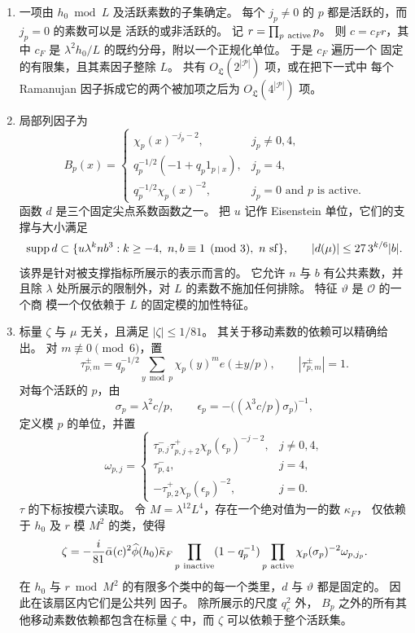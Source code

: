 \begin{enumerate}
\item 一项由 $h_0\bmod L$ 及活跃素数的子集确定。
每个 $j_p\ne0$ 的 $p$ 都是活跃的，而 $j_p=0$ 的素数可以是
活跃的或非活跃的。 记 $r=\prod_{p\ {\rm active}}p$。 则
$c=c_Fr$，其中 $c_F$ 是
$\lambda^2h_0/L$ 的既约分母，附以一个正规化单位。 于是 $c_F$ 遍历一个
固定的有限集，且其素因子整除 $L$。 共有
$O_{\mathfrak L}(2^{|\mathcal P|})$ 项，或在把下一式中
每个 Ramanujan 因子拆成它的两个被加项之后为
$O_{\mathfrak L}(4^{|\mathcal P|})$ 项。

\item 局部列因子为
\[
 B_p(x)=\begin{cases}
 \chi_p(x)^{-j_p-2},&j_p\ne0,4,\\
 q_p^{-1/2}(-1+q_p1_{p\mid x}),&j_p=4,\\
 q_p^{-1/2}\chi_p(x)^{-2},&j_p=0\text{ and }p\text{ is active}.
 \end{cases}
\]
函数 $d$ 是三个固定尖点系数函数之一。
把 $u$ 记作 Eisenstein 单位，它们的支撑与大小满足
\begin{equation}
 \operatorname{supp}d\subset
 \{u\lambda^k n b^3:k\ge-4,\ n,b\equiv1\pmod3,\ n\ {\rm sf}\},
 \qquad |d(\mu)|\le27\,3^{k/6}|b|.
 \label{old-eq:4.3}
\end{equation}
该界是针对被支撑指标所展示的表示而言的。
它允许 $n$ 与 $b$ 有公共素数，并且除
$\lambda$ 处所展示的限制外，对 $L$ 的素数不施加任何排除。
特征 $\vartheta$ 是 $\mathcal O$ 的一个商
模一个仅依赖于 $L$ 的固定模的加性特征。

\item 标量 $\zeta$ 与 $\mu$ 无关，且满足
$|\zeta|\le1/81$。 其关于移动素数的依赖可以精确给出。
对 $m\not\equiv0\pmod6$，置
\[
 \tau_{p,m}^{\pm}=q_p^{-1/2}\sum_{y\bmod p}\chi_p(y)^m e(\pm y/p),
 \qquad |\tau_{p,m}^{\pm}|=1.
\]
对每个活跃的 $p$，由
\[
 \sigma_p=\lambda^2c/p,\qquad
 \epsilon_p=-\big((\lambda^3c/p)\sigma_p\big)^{-1},
\]
定义模 $p$ 的单位，并置
\[
 \omega_{p,j}=\begin{cases}
 \tau_{p,j}^{-}\tau_{p,j+2}^{+}\chi_p(\epsilon_p)^{-j-2},&j\ne0,4,\\
 \tau_{p,4}^{-},&j=4,\\
 -\tau_{p,2}^{+}\chi_p(\epsilon_p)^{-2},&j=0.
 \end{cases}
\]
$\tau$ 的下标按模六读取。 令
$M=\lambda^{12}L^4$，存在一个绝对值为一的数 $\kappa_F$，
仅依赖于 $h_0$ 及 $r$ 模 $M^2$ 的类，使得
\begin{equation}\label{eq:reflection-row-phase}
 \zeta=-\frac i{81}\bar\alpha(c)^2\widehat\phi(h_0)\bar\kappa_F
 \prod_{p\ {\rm inactive}}(1-q_p^{-1})
 \prod_{p\ {\rm active}}\chi_p(\sigma_p)^{-2}\omega_{p,j_p}.
\end{equation}
在 $h_0$ 与 $r\bmod M^2$ 的有限多个类中的每一个类里，$d$
与 $\vartheta$ 都是固定的。 因此在该扇区内它们是公共列
因子。 除所展示的尺度 $q_c^2$ 外，
$B_p$ 之外的所有其他移动素数依赖都包含在标量
$\zeta$ 中，而 $\zeta$ 可以依赖于整个活跃集。


\end{enumerate}

